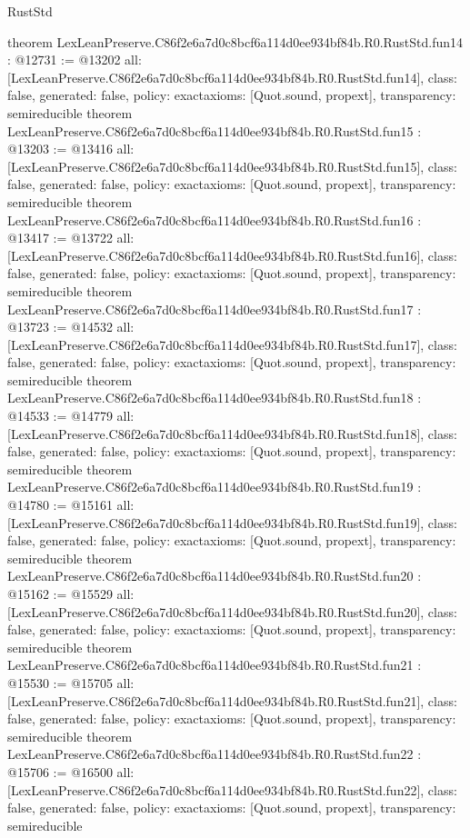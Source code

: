 \begin{lexlean}{RustStd}
\begin{coremodule}
{}
theorem LexLeanPreserve.C86f2e6a7d0c8bcf6a114d0ee934bf84b.R0.RustStd.fun14 : @12731 := @13202 {
  all: [LexLeanPreserve.C86f2e6a7d0c8bcf6a114d0ee934bf84b.R0.RustStd.fun14],
  class: false,
  generated: false,
  policy: exact{axioms: [Quot.sound, propext]},
  transparency: semireducible
}
theorem LexLeanPreserve.C86f2e6a7d0c8bcf6a114d0ee934bf84b.R0.RustStd.fun15 : @13203 := @13416 {
  all: [LexLeanPreserve.C86f2e6a7d0c8bcf6a114d0ee934bf84b.R0.RustStd.fun15],
  class: false,
  generated: false,
  policy: exact{axioms: [Quot.sound, propext]},
  transparency: semireducible
}
theorem LexLeanPreserve.C86f2e6a7d0c8bcf6a114d0ee934bf84b.R0.RustStd.fun16 : @13417 := @13722 {
  all: [LexLeanPreserve.C86f2e6a7d0c8bcf6a114d0ee934bf84b.R0.RustStd.fun16],
  class: false,
  generated: false,
  policy: exact{axioms: [Quot.sound, propext]},
  transparency: semireducible
}
theorem LexLeanPreserve.C86f2e6a7d0c8bcf6a114d0ee934bf84b.R0.RustStd.fun17 : @13723 := @14532 {
  all: [LexLeanPreserve.C86f2e6a7d0c8bcf6a114d0ee934bf84b.R0.RustStd.fun17],
  class: false,
  generated: false,
  policy: exact{axioms: [Quot.sound, propext]},
  transparency: semireducible
}
theorem LexLeanPreserve.C86f2e6a7d0c8bcf6a114d0ee934bf84b.R0.RustStd.fun18 : @14533 := @14779 {
  all: [LexLeanPreserve.C86f2e6a7d0c8bcf6a114d0ee934bf84b.R0.RustStd.fun18],
  class: false,
  generated: false,
  policy: exact{axioms: [Quot.sound, propext]},
  transparency: semireducible
}
theorem LexLeanPreserve.C86f2e6a7d0c8bcf6a114d0ee934bf84b.R0.RustStd.fun19 : @14780 := @15161 {
  all: [LexLeanPreserve.C86f2e6a7d0c8bcf6a114d0ee934bf84b.R0.RustStd.fun19],
  class: false,
  generated: false,
  policy: exact{axioms: [Quot.sound, propext]},
  transparency: semireducible
}
theorem LexLeanPreserve.C86f2e6a7d0c8bcf6a114d0ee934bf84b.R0.RustStd.fun20 : @15162 := @15529 {
  all: [LexLeanPreserve.C86f2e6a7d0c8bcf6a114d0ee934bf84b.R0.RustStd.fun20],
  class: false,
  generated: false,
  policy: exact{axioms: [Quot.sound, propext]},
  transparency: semireducible
}
theorem LexLeanPreserve.C86f2e6a7d0c8bcf6a114d0ee934bf84b.R0.RustStd.fun21 : @15530 := @15705 {
  all: [LexLeanPreserve.C86f2e6a7d0c8bcf6a114d0ee934bf84b.R0.RustStd.fun21],
  class: false,
  generated: false,
  policy: exact{axioms: [Quot.sound, propext]},
  transparency: semireducible
}
theorem LexLeanPreserve.C86f2e6a7d0c8bcf6a114d0ee934bf84b.R0.RustStd.fun22 : @15706 := @16500 {
  all: [LexLeanPreserve.C86f2e6a7d0c8bcf6a114d0ee934bf84b.R0.RustStd.fun22],
  class: false,
  generated: false,
  policy: exact{axioms: [Quot.sound, propext]},
  transparency: semireducible
}
\end{coremodule}
\end{lexlean}
